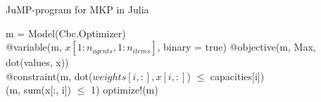 \documentclass[b5paper]{article}
\begin{document}
\begin{algorithm}[H]
\caption{JuMP-program for MKP in Julia}\label{alg:cap}
\begin{algorithmic}
\State m = Model(Cbc.Optimizer)  
\\
\State @variable(m, $x[1:n_{agents}, 1:n_{items}]$, binary = true) 
\State @objective(m, Max, dot(values, x)) 
\\
    \State @constraint(m, dot($weights[i, :], x[i, :]$) $\leq$ capacities[i]) 
\EndFor
\\

 
    \State@constraint(m, sum(x[:, i]) $\leq$ 1) 
\EndFor
\State optimize!(m) 
\end{algorithmic}
\end{algorithm}
    
\end{document}
